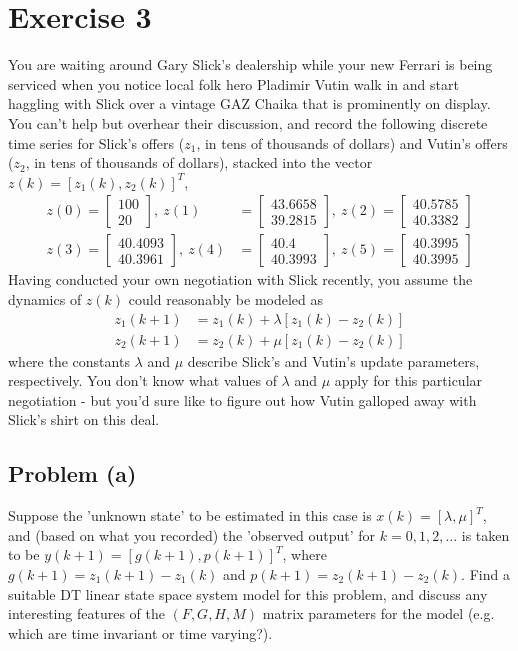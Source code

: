 \documentclass[11pt]{article}
\begin{document}
\section*{Exercise 3}
You are waiting around Gary Slick's dealership while your new Ferrari is being serviced when you notice local folk hero Pladimir Vutin walk in and start haggling with Slick over a vintage GAZ Chaika that is prominently on display. You can't help but overhear their discussion, and record the following discrete time series for Slick's offers ($z_1$, in tens of thousands of dollars) and Vutin's offers ($z_2$, in tens of thousands of dollars), stacked into the vector $z(k)=[z_1(k),z_2(k)]^T$,
\begin{align*}
	z(0) = \begin{bmatrix} 100 \\ 20 \end{bmatrix},\ z(1) &= \begin{bmatrix} 43.6658 \\ 39.2815 \end{bmatrix},\ z(2) = \begin{bmatrix} 40.5785 \\ 40.3382 \end{bmatrix} \\
	z(3) = \begin{bmatrix} 40.4093 \\ 40.3961 \end{bmatrix},\ z(4) &= \begin{bmatrix} 40.4 \\ 40.3993 \end{bmatrix},\ z(5) = \begin{bmatrix} 40.3995 \\ 40.3995 \end{bmatrix}
\end{align*}
Having conducted your own negotiation with Slick recently, you assume the dynamics of $z(k)$ could reasonably be modeled as
\begin{align*}
	z_1(k+1)&=z_1(k)+\lambda[z_1(k) - z_2(k)] \\
	z_2(k+1)&=z_2(k)+\mu[z_1(k)-z_2(k)]
\end{align*}
where the constants $\lambda$ and $\mu$ describe Slick's and Vutin's update parameters, respectively. You don't know what values of $\lambda$ and $\mu$ apply for this particular negotiation - but you'd sure like to figure out how Vutin galloped away with Slick's shirt on this deal.
\subsection*{Problem (a)}
Suppose the 'unknown state' to be estimated in this case is $x(k)=[\lambda,\mu]^T$, and (based on what you recorded) the 'observed output' for $k=0,1,2,\dots$ is taken to be $y(k+1)=[g(k+1),p(k+1)]^T$, where $g(k+1)=z_1(k+1)-z_1(k)$ and $p(k+1) = z_2(k+1)-z_2(k)$. Find a suitable DT linear state space system model for this problem, and discuss any interesting features of the $(F,G,H,M)$ matrix parameters for the model (e.g. which are time invariant or time varying?).
\end{document}
